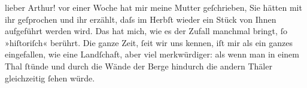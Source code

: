 \pstart{}lieber Arthur!\pend\vspace{0.5em}
\pstart
           vor einer Woche hat mir meine Mutter geſchrieben, Sie hätten mit ihr geſprochen und ihr erzählt, daſs im
               Herbſt wieder ein Stück von Ihnen aufgeführt
               werden wird. Das hat mich, wie es der Zufall manchmal bringt,{ }ſo »hiſtoriſch«
               berührt. Die ganze Zeit,{ }ſeit wir uns kennen, iſt mir als ein ganzes eingefallen, wie
               eine Landſchaft, {\pb}aber viel
               merkwürdiger: als wenn man in einem Thal{ }ſtünde und durch die Wände der Berge
               hindurch die andern Thäler gleichzeitig{ }ſehen würde.\pend
           
